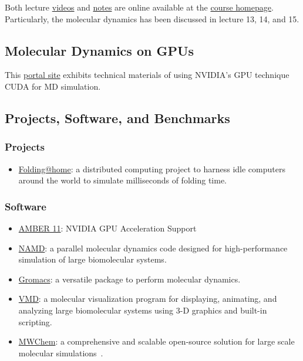 \documentclass[a4paper,10pt,technote,compsoc,onecolumn]{IEEEtran}
\numberwithin{equation}{section}
\begin{document}
Both lecture
\href{http://ocw.mit.edu/courses/materials-science-and-engineering/3-320-atomistic-computer-modeling-of-materials-sma-5107-spring-2005/video-lectures}{videos}
and
\href{http://ocw.mit.edu/courses/materials-science-and-engineering/3-320-atomistic-computer-modeling-of-materials-sma-5107-spring-2005/lecture-notes}{notes}
are online available at the
\href{http://ocw.mit.edu/courses/materials-science-and-engineering/3-320-atomistic-computer-modeling-of-materials-sma-5107-spring-2005}{course
homepage}.  Particularly, the molecular dynamics has been discussed in lecture
13, 14, and 15.

\subsection{Molecular Dynamics on GPUs}
This \href{http://www.nvidia.com/object/molecular_dynamics.html}{portal site}
exhibits technical materials of using NVIDIA's \ac{GPU}
technique \ac{CUDA} for \ac{MD} simulation.

\subsection{Projects, Software, and Benchmarks}
\subsubsection{Projects}
\begin{itemize}
  \item \href{http://folding.stanford.edu}{Folding@home}: a distributed
  computing project to harness idle computers around the world to simulate
  milliseconds of folding time.
\end{itemize}

\subsubsection{Software}
\begin{itemize}
  \item \href{http://ambermd.org/gpus/}{AMBER 11}: NVIDIA \ac{GPU} Acceleration
  Support 
  
  \item \href{http://www.ks.uiuc.edu/Research/namd/}{NAMD}: a parallel
  molecular dynamics code designed for high-performance simulation of large
  biomolecular systems.
  
  \item \href{http://www.gromacs.org/}{Gromacs}: a versatile package to perform
  molecular dynamics.

  \item \href{http://www.ks.uiuc.edu/Research/vmd/}{VMD}: a molecular
  visualization program for displaying, animating, and analyzing large
  biomolecular systems using 3-D graphics and built-in scripting.

  \item \href{http://www.nwchem-sw.org/}{MWChem}: a comprehensive and scalable
  open-source solution for large scale molecular
  simulations~\cite{valiev10cpc}.
\end{itemize}
\end{document}
